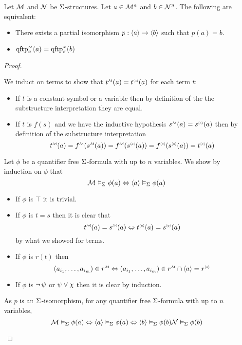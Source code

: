 \begin{prop}
    Let $\mathcal{M}$ and $\mathcal{N}$ be $\Sigma$-structures. 
    Let $a \in \mathcal{M}^n$ and $b \in \mathcal{N}^n$.
    The following are equivalent:
    \begin{itemize}
        \item There exists a partial isomorphism $p : \langle a\rangle \to \langle b\rangle$ 
            such that $p(a) = b$.
        \item $\subintp{\nothing}{\MM}{\qftp}(a) = 
            \subintp{\nothing}{\NN}{\qftp}(b)$
    \end{itemize}
\end{prop}
\begin{proof}
    \begin{forward}
        We induct on terms to show that $\mmintp{t}(a) = \modintp{\<a\>}{t}(a)$
        for each term $t$:
        \begin{itemize}
            \item If $t$ is a constant symbol or a variable 
                then by definition of the 
                the substructure interpretation they are equal.
            \item If $t$ is $f(s)$ and we have the inductive hypothesis 
                $\mmintp{s}(a) = \modintp{\<a\>}{s}(a)$
                then by definition of the substructure interpretation
                \[
                    \mmintp{t}(a) = \mmintp{f}(\mmintp{s}(a))
                    = \mmintp{f}(\modintp{\<a\>}{s}(a))
                    = \modintp{\<a\>}{f}(\modintp{\<a\>}{s}(a))
                    = \modintp{\<a\>}{t}(a)
                \]
        \end{itemize}
    
    Let $\phi$ be a quantifier free $\Sigma$-formula with up to $n$ variables.
    We show by induction on $\phi$ that 
    \[
        \mathcal{M} \vDash_{\Sigma} \phi(a)
        \Leftrightarrow \langle a\rangle \vDash_{\Sigma} \phi(a)
    \]
    \begin{itemize}
        \item If $\phi$ is $\top$ it is trivial.
        \item If $\phi$ is $t = s$ then it is clear that
            \[
                \mmintp{t}(a) = \mmintp{s}(a)
                \iff \modintp{\<a\>}{t}(a) = \modintp{\<a\>}{s}(a)
            \]
            by what we showed for terms.
        \item If $\phi$ is $r(t)$ then 
            \[  
                (a_{i_1},\dots, a_{i_m}) \in \mmintp{r}
                \iff (a_{i_1},\dots, a_{i_m}) \in 
                \mmintp{r} \cap \<a\> = \modintp{\<a\>}{r}
            \]
        \item If $\phi$ is $\neg\, \psi$ or $\psi \lor \chi$ then it is 
            clear by induction.
    \end{itemize}
    As $p$ is an $\Sigma$-isomorphism, for any quantifier free $\Sigma$-formula
    with up to $n$ variables,
    \[\mathcal{M} \vDash_{\Sigma} \phi(a) \Leftrightarrow \langle a\rangle \vDash_{\Sigma} \phi(a)
    \Leftrightarrow \langle b\rangle \vDash_{\Sigma} \phi(b)
    \mathcal{N} \vDash_{\Sigma} \phi(b)\]
    \end{forward}


\end{proof}
